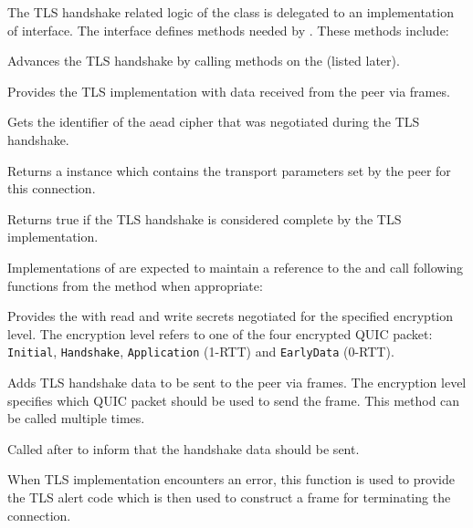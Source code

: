 The TLS handshake related logic of the \ManagedQuicConnection{} class is delegated to an
implementation of \ITls{} interface. The \ITls{} interface defines methods needed by
\ManagedQuicConnection{}. These methods include:

\begin{description}

   Advances the TLS handshake by calling methods
on the \ManagedQuicConnection{} (listed later).

   Provides the TLS implementation with data received from the peer via
\CRYPTO{} frames.

   Gets the identifier of the \gls{aead}
cipher that was negotiated during the TLS handshake.

   Returns a \TransportParameters{}
instance which contains the transport parameters set by the peer for this connection.

   Returns true if the TLS handshake is
considered complete by the TLS implementation.

\end{description}

Implementations of \ITls{} are expected to maintain a reference to the \ManagedQuicConnection{} and
call following functions from the  method when appropriate:

\begin{description}

   Provides the
\ManagedQuicConnection{} with read and write secrets negotiated for the specified encryption level.
The encryption level refers to one of the four encrypted QUIC packet: \texttt{Initial},
\texttt{Handshake}, \texttt{Application} (1-RTT) and \texttt{EarlyData} (0-RTT).

   Adds TLS handshake data to be sent to the peer via \CRYPTO{} frames.
The encryption level specifies which QUIC packet should be used to send the \CRYPTO{} frame. This
method can be called multiple times.

   Called after  to
inform \ManagedQuicConnection{} that the handshake data should be sent.

   When
TLS implementation encounters an error, this function is used to provide the TLS alert code which is
then used to construct a \CONNECTIONCLOSE{} frame for terminating the connection.

\end{description}

